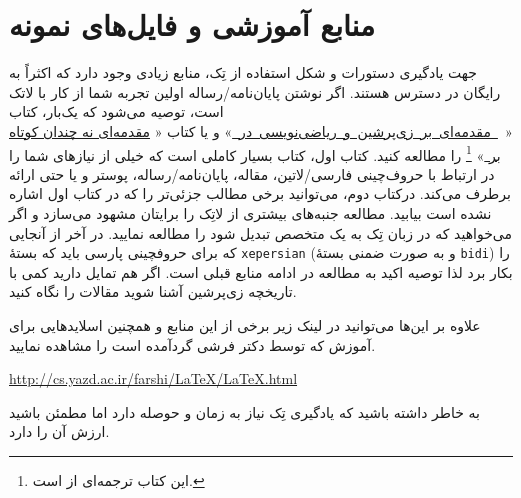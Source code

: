 \section{منابع آموزشی و فایل‌های نمونه}
جهت یادگیری دستورات و شکل استفاده از تِک، منابع زیادی وجود دارد که اکثراً به رایگان
در دسترس هستند. 
     اگر نوشتن پایان‌نامه/رساله اولین تجربه شما از کار با لاتک است، توصیه می‌شود که یک‌بار، 
     کتاب \hbox{«%
    \href{http://opac.nlai.ir/opac-prod/bibliographic/4728642}{%
    مقدمه‌ای بر زی‌پرشین و ریاضی‌نویسی در \lr{\LaTeX}}»}%
    \cite{razavianAmintoosiTayebi}
    و یا کتاب «%
    \href{http://www.tug.ctan.org/tex-archive/info/lshort/persian/lshort.pdf}{مقدمه‌ای نه چندان کوتاه بر \lr{\LaTeXe}}»%
    \cite{Omidali1387Lshort}\footnote{این کتاب ترجمه‌ای از \cite{lshort} است.}
        را مطالعه کنید. کتاب اول، کتاب بسیار کاملی است که خیلی از نیازهای شما را در ارتباط با حروف‌چینی فارسی/لاتین، مقاله، 
        پایان‌نامه/رساله\cite{AmintoosiHSUThesis}، پوستر\cite{xebaposter} و یا حتی  ارائه\cite{beamer} برطرف می‌کند.
        درکتاب دوم، می‌توانید برخی مطالب جزئی‌تر را که در کتاب اول اشاره نشده است بیابید. مطالعه \cite{lamport} جنبه‌های بیشتری از لاتِک را برایتان مشهود 
        می‌سازد و اگر می‌خواهید که در زبان تِک به یک متخصص تبدیل شود \cite{knuth:texbook} را مطالعه نمایید. در آخر از آنجایی که برای حروفچینی 
        پارسی باید که بسته‌ٔ \Verb+xepersian+ (و به صورت ضمنی بستهٔ \Verb+bidi+) را بکار برد لذا توصیه اکید به مطالعه \cite{bidi,xepersian}
        در ادامه منابع قبلی است. 
    اگر هم تمایل دارید کمی با تاریخچه زی‌پرشین آشنا شوید مقالات\cite{Xepersian-IMS-1391,Xepersian-IMS-1392,newamintoosi} را نگاه کنید. 

    علاوه بر این‌ها می‌توانید در لینک زیر برخی از این منابع و همچنین اسلایدهایی برای آموزش که توسط دکتر فرشی گردآمده است را مشاهده نمایید.

\centerline{\url{http://cs.yazd.ac.ir/farshi/LaTeX/LaTeX.html}}

    به خاطر داشته باشید که یادگیری تِک نیاز به زمان و حوصله دارد اما مطمئن باشید ارزش آن را دارد.
